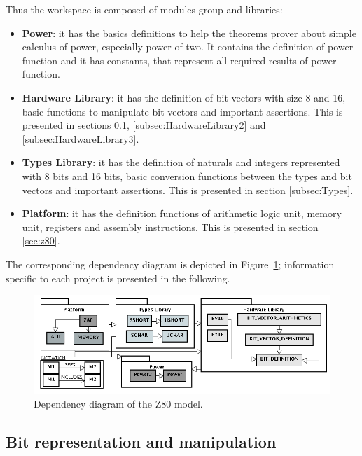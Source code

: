 \documentclass[a4paper]{llncs}
\begin{document}
Thus the workspace is composed of modules group and libraries: 
\begin{itemize}

\item \textbf{Power}: it has the basics definitions to help the theorems
prover about simple calculus of power, especially power of two. It contains the definition of power function
and it has constants, that represent all required results of power function. 

\item \textbf{Hardware Library}: it has the definition of bit vectors with size 8 and 16, basic functions to manipulate bit vectors and important assertions. This is presented in sections \ref{subsec:HardwareLibrary1}, \ref{subsec:HardwareLibrary2} and \ref{subsec:HardwareLibrary3}.
 
 \item \textbf{Types Library}: it has the definition of naturals and integers represented with  8 bits and 16 bits, basic conversion functions between the types and bit vectors and important assertions. This is presented in section \ref{subsec:Types}.
 
 \item \textbf{Platform}: it has the definition functions of arithmetic logic unit,  memory unit, registers and assembly instructions. This is presented in section \ref{sec:z80}.
 

 
\end{itemize}

 The corresponding dependency
diagram is depicted in Figure~\ref{fig:hardware-definition-graph}; information specific to each project is
presented in the following.


\begin{figure}[h]
\centering
\includegraphics[width=.77\textwidth]{diagramaEstrutural_vertical_ProB.png}
 \caption{Dependency diagram of the Z80 model.}
\label{fig:hardware-definition-graph}
\end{figure}



\subsection{Bit representation and manipulation}
\label{subsec:HardwareLibrary1}
\end{document}

